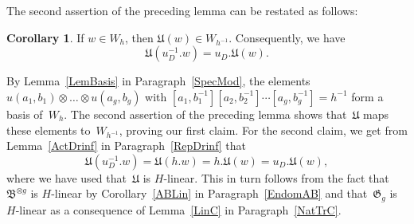\documentclass[12pt]{article}
\makeatletter
\theoremstyle{definition}
\newtheorem{Cor}[Satz]{Corollary}
\theoremstyle{break}
\renewenvironment{proof}[1][\proofname]{\par
\vspace{-5pt}%
\pushQED{\qed}%
\normalfont
\topsep0pt \partopsep0pt %
\trivlist
\item[\hskip\labelsep
\bfseries
#1\@addpunct{.}]\ignorespaces
}{%
\popQED\endtrivlist\@endpefalse
\addvspace{6pt plus 6pt} %
}
\newcommand{\fB}{\mathfrak{B}}
\newcommand{\fG}{\mathfrak{G}}
\newcommand{\fU}{\mathfrak{U}}
\renewcommand{\1}{\mathbbm{1}}
\newcommand{\ot}{\mathbin{\otimes}}
\newcommand{\uu}{u}
\makeatother
\begin{document}
The second assertion of the preceding lemma can be restated as follows:
\begin{Cor} \label{CorDrinfU}
If $w \in W_h$, then $\fU(w) \in W_{h^{-1}}$. Consequently, we have
\[\fU(u_D^{-1}.w) = u_D.\fU(w).\]
\end{Cor}
\begin{proof}
By Lemma~\ref{LemBasis} in Paragraph~\ref{SpecMod}, the elements
$\uu(a_1,b_1) \ot \dots \ot \uu(a_g,b_g)$ with
$[a_1,b_1^{-1}][a_2,b_2^{-1}] \cdots [a_g,b_g^{-1}] = h^{-1}$ form a basis of~$W_h$. The second assertion of the preceding lemma shows that~$\fU$ maps these elements to~$W_{h^{-1}}$, proving our first claim. For the second claim, we get from Lemma~\ref{ActDrinf} in Paragraph~\ref{RepDrinf} that
\[\fU(u_D^{-1}.w) = \fU(h.w) = h.\fU(w) = u_D.\fU(w), \]
where we have used that~$\fU$ is $H$-linear. This in turn follows from the fact that~$\fB^{\ot g}$ is $H$-linear by Corollary~\ref{ABLin} in Paragraph~\ref{EndomAB} and that~$\fG_g$ is $H$-linear as a consequence of Lemma~\ref{LinC} in Paragraph~\ref{NatTrC}.
\end{proof}
\end{document}
